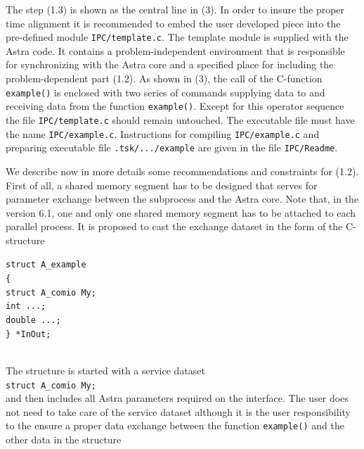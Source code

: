 \documentclass[12pt]{article}
\newcommand{\tw}[1]{\texttt{#1}}
\begin{document}
The step (1.3) is shown as the central line in (3). 
In order to insure the proper time alignment it is recommended to 
embed the user developed piece into the pre-defined module
\tw{IPC/template.c}. 
The template module is supplied with the Astra code.
It contains a problem-independent environment that is responsible for
synchronizing with the Astra core and a specified place for including the
problem-dependent part (1.2). 
As shown in (3), the call of the C-function \tw{example()} is enclosed with two
series of commands supplying data to and receiving data from the function
\tw{example()}. 
Except for this operator sequence the file \tw{IPC/template.c} should remain
untouched.
The executable file must have the name \tw{IPC/example.c}. 
Instructions for compiling \tw{IPC/example.c} and preparing executable file 
\tw{.tsk/.../example} are given in the file \tw{IPC/Readme}. 

We describe now in more details some recommendations and constraints for
(1.2).  
First of all, a shared memory segment has to be designed that serves for
parameter exchange between the subprocess and the Astra core.
Note that, in the version 6.1, one and only one
shared memory segment has to be attached to each parallel process.
It is proposed to cast the exchange dataset in the form of the C-structure 
\\[5pt]
\hspace*{25pt}\parbox{10cm}{
\tw{struct A\_example\\
  \{\\
    struct A\_comio My;\\
    int  ...;\\
    double ...;\\
  \} *InOut;}}\\[5pt]
The structure is started with a service dataset
\\[2pt] 
\hspace*{25pt}\tw{struct A\_comio My;} 
\\[2pt] 
and then includes all Astra parameters required on the interface.
The user does not need to take care of the service dataset although it is the
user responsibility to the ensure a proper data exchange between the function 
\tw{example()} and the other data in the structure
\end{document}
